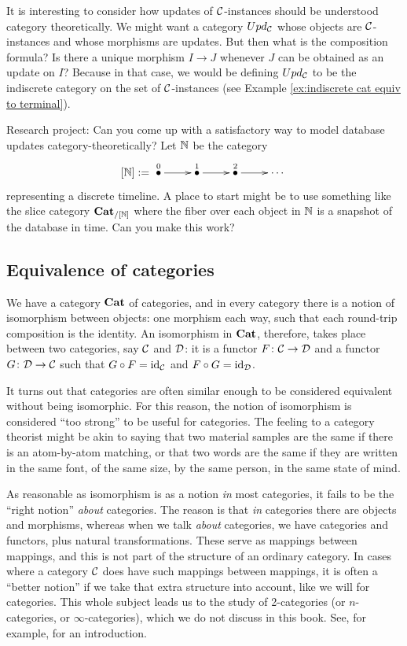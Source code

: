 It is interesting to consider how updates of $\mathcal{C}$-instances should be understood category theoretically. We might want a category $Upd_\mathcal{C}$ whose objects are $\mathcal{C}$-instances and whose morphisms are updates. But then what is the composition formula? Is there a unique morphism $I\to J$ whenever $J$ can be obtained as an update on $I$? Because in that case, we would be defining $Upd_\mathcal{C}$ to be the indiscrete category on the set of $\mathcal{C}$-instances (see Example \ref{ex:indiscrete cat equiv to terminal}).

\begin{exercise}
Research project: Can you come up with a satisfactory way to model database updates category-theoretically? Let ${\mathbb N}$ be the category
$$[\NN]:=\xymatrix{\LMO{0}\ar[r]&\LMO{1}\ar[r]&\LMO{2}\ar[r]&\cdots}$$ 
representing a discrete timeline. A place to start might be to use something like the slice category ${\bf Cat}_{/[{\mathbb N}]}$ where the fiber over each object in ${\mathbb N}$ is a snapshot of the database in time. Can you make this work?
\end{exercise}



\subsection{Equivalence of categories}\label{sec:equivalence of cats}

We have a category ${\bf Cat}$ of categories, and in every category there is a notion of isomorphism between objects: one morphism each way, such that each round-trip composition is the identity. An isomorphism in ${\bf Cat}$, therefore, takes place between two categories, say $\mathcal{C}$ and $\mathcal{D}$: it is a functor $F\colon\mathcal{C}\rightarrow\mathcal{D}$ and a functor $G\colon\mathcal{D}\rightarrow\mathcal{C}$ such that $G\circ F=\textnormal{id}_\mathcal{C}$ and $F\circ G=\textnormal{id}_\mathcal{D}$. 

It turns out that categories are often similar enough to be considered equivalent without being isomorphic. For this reason, the notion of isomorphism is considered “too strong” to be useful for categories. The feeling to a category theorist might be akin to saying that two material samples are the same if there is an atom-by-atom matching, or that two words are the same if they are written in the same font, of the same size, by the same person, in the same state of mind. 

As reasonable as isomorphism is as a notion {\em in} most categories, it fails to be the “right notion” {\em about} categories. The reason is that {\em in} categories there are objects and morphisms, whereas when we talk {\em about} categories, we have categories and functors, plus natural transformations. These serve as mappings between mappings, and this is not part of the structure of an ordinary category. In cases where a category $\mathcal{C}$ does have such mappings between mappings, it is often a “better notion” if we take that extra structure into account, like we will for categories. This whole subject leads us to the study of 2-categories (or $n$-categories, or $\infty$-categories), which we do not discuss in this book. See, for example, \cite{Le1} for an introduction.

